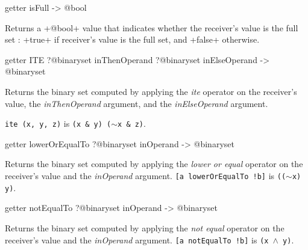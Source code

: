 \begin{galgasbox}
getter isFull -> @bool
\end{galgasbox}

Returns a \ggs+@bool+ value that indicates whether the receiver's value is the full set : \ggs+true+ if receiver's value is the full set, and \ggs+false+ otherwise.








\begin{galgasbox}
getter ITE ?@binaryset inThenOperand ?@binaryset inElseOperand -> @binaryset
\end{galgasbox}


Returns the binary set computed by applying the \emph{ite} operator on the receiver's value, the \emph{inThenOperand} argument, and the  \emph{inElseOperand} argument.

{\texttt{ite (x, y, z)} is \texttt{(x \& y) \textbar ($\sim$x \& z)}.}








\begin{galgasbox}
getter lowerOrEqualTo ?@binaryset inOperand -> @binaryset
\end{galgasbox}


Returns the binary set computed by applying the \emph{lower or equal} operator on the receiver's value and the \emph{inOperand} argument.
{\texttt{[a lowerOrEqualTo !b]} is \texttt{(($\sim$x) \textbar y)}.}








\begin{galgasbox}
getter notEqualTo ?@binaryset inOperand -> @binaryset
\end{galgasbox}


Returns the binary set computed by applying the \emph{not equal} operator on the receiver's value and the \emph{inOperand} argument.
{\texttt{[a notEqualTo !b]} is \texttt{(x $\wedge$ y)}.}








